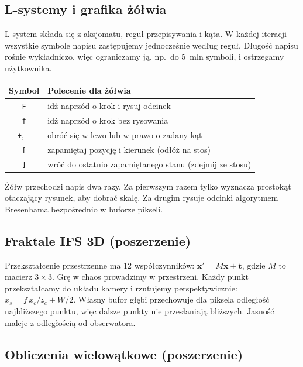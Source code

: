 \documentclass[11pt,a4paper]{article}
\newcommand{\kod}[1]{\texttt{#1}}
\begin{document}
\subsection{L-systemy i grafika żółwia}

L-system składa się z aksjomatu, reguł przepisywania i kąta. W każdej
iteracji wszystkie symbole napisu zastępujemy jednocześnie według reguł.
Długość napisu rośnie wykładniczo, więc ograniczamy ją, np.\ do 5~mln
symboli, i ostrzegamy użytkownika.

\begin{center}
\begin{tabular}{@{}cl@{}}
  \toprule
  Symbol & Polecenie dla żółwia \\
  \midrule
  \kod{F} & idź naprzód o krok i rysuj odcinek \\
  \kod{f} & idź naprzód o krok bez rysowania \\
  \kod{+}, \kod{-} & obróć się w lewo lub w prawo o zadany kąt \\
  \kod{[} & zapamiętaj pozycję i kierunek (odłóż na stos) \\
  \kod{]} & wróć do ostatnio zapamiętanego stanu (zdejmij ze stosu) \\
  \bottomrule
\end{tabular}
\end{center}

Żółw przechodzi napis dwa razy. Za pierwszym razem tylko wyznacza prostokąt
otaczający rysunek, aby dobrać skalę. Za drugim rysuje odcinki algorytmem
Bresenhama bezpośrednio w buforze pikseli.

\subsection{Fraktale IFS 3D (poszerzenie)}

Przekształcenie przestrzenne ma 12 współczynników:
$\mathbf{x}' = M\mathbf{x} + \mathbf{t}$, gdzie $M$ to macierz $3 \times 3$.
Grę w chaos prowadzimy w przestrzeni. Każdy punkt przekształcamy do układu
kamery i rzutujemy perspektywicznie: $x_s = f\,x_c / z_c + W/2$. Własny bufor
głębi przechowuje dla piksela odległość najbliższego punktu, więc dalsze
punkty nie przesłaniają bliższych. Jasność maleje z odległością od
obserwatora.

\subsection{Obliczenia wielowątkowe (poszerzenie)}
\end{document}
